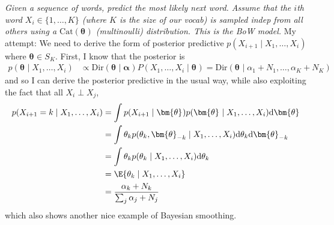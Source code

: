 \documentclass[11pt]{article}
\renewcommand\vec[2][]{\bm{#2}_{#1}}
\begin{document}
\begin{example}
	\textit{Given a sequence of words, predict the most likely next word. Assume that the $i$th word $X_i \in \{1, \ldots, K\}$ (where $K$ is the size of our vocab) is sampled indep from all others using a $\text{Cat}(\vec\theta)$ (multinoulli) distribution. This is the BoW model.}
	\tcblower
	My attempt: We need to derive the form of posterior predictive $p(X_{i+1} \mid X_1, \ldots, X_i)$ where $\vec\theta \in S_K$. First, I know that the posterior is
	\begin{align}
		p(\vec\theta \mid X_1, \ldots, X_i)
			&\propto \text{Dir}(\vec\theta \mid \vec\alpha) P(X_1, \ldots, X_i \mid \vec\theta) 
			= \text{Dir}(\vec\theta \mid \alpha_1 + N_1, \ldots, \alpha_K + N_K)
	\end{align}
	and so I can derive the posterior predictive in the usual way, while also exploiting the fact that all $X_i \perp X_j$,
	\begin{align}
		p(X_{i+1} = k \mid X_1, \ldots, X_i)
			&= \int p(X_{i+1} \mid \vec\theta) p(\vec\theta \mid X_1, \ldots, X_i)  \mathrm{d}\vec\theta \\
			&= \int \theta_k  
			  p(\theta_k, \vec[-k]{\theta}  \mid X_1, \ldots, X_i)
			  \mathrm{d}\theta_k \mathrm{d}\vec[-k]{\theta} \\
			&= \int \theta_k p(\theta_k \mid X_1, \ldots, X_i) \mathrm{d}\theta_k \\
			&= \E{\theta_k \mid X_1, \ldots, X_i} \\
			&= \frac{\alpha_k + N_k}{\sum_j \alpha_j + N_j}
	\end{align}
	which also shows another nice example of Bayesian smoothing. 
\end{example}
\end{document}
